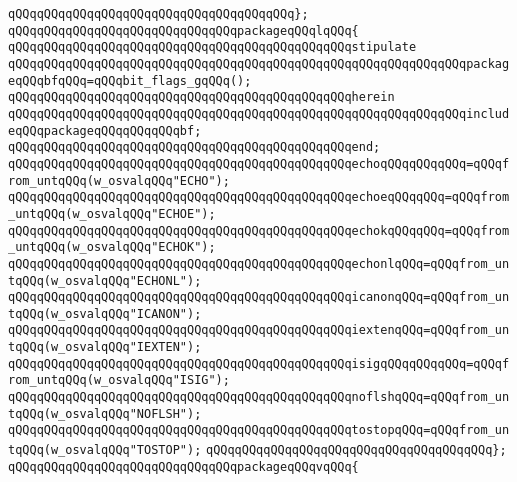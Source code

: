 \verb|qQQqqQQqqQQqqQQqqQQqqQQqqQQqqQQqqQQqqQQq};|\newline
\newline
\verb|qQQqqQQqqQQqqQQqqQQqqQQqqQQqqQQqpackageqQQqlqQQq{|\newline
\newline
\verb|qQQqqQQqqQQqqQQqqQQqqQQqqQQqqQQqqQQqqQQqqQQqqQQqstipulate|\newline
\verb|qQQqqQQqqQQqqQQqqQQqqQQqqQQqqQQqqQQqqQQqqQQqqQQqqQQqqQQqqQQqqQQqpackageqQQqbfqQQq=qQQqbit_flags_gqQQq();|\newline
\verb|qQQqqQQqqQQqqQQqqQQqqQQqqQQqqQQqqQQqqQQqqQQqqQQqherein|\newline
\verb|qQQqqQQqqQQqqQQqqQQqqQQqqQQqqQQqqQQqqQQqqQQqqQQqqQQqqQQqqQQqqQQqincludeqQQqpackageqQQqqQQqqQQqbf;|\newline
\verb|qQQqqQQqqQQqqQQqqQQqqQQqqQQqqQQqqQQqqQQqqQQqqQQqend;|\newline
\newline
\verb|qQQqqQQqqQQqqQQqqQQqqQQqqQQqqQQqqQQqqQQqqQQqqQQqechoqQQqqQQqqQQq=qQQqfrom_untqQQq(w_osvalqQQq"ECHO");|\newline
\verb|qQQqqQQqqQQqqQQqqQQqqQQqqQQqqQQqqQQqqQQqqQQqqQQqechoeqQQqqQQq=qQQqfrom_untqQQq(w_osvalqQQq"ECHOE");|\newline
\verb|qQQqqQQqqQQqqQQqqQQqqQQqqQQqqQQqqQQqqQQqqQQqqQQqechokqQQqqQQq=qQQqfrom_untqQQq(w_osvalqQQq"ECHOK");|\newline
\verb|qQQqqQQqqQQqqQQqqQQqqQQqqQQqqQQqqQQqqQQqqQQqqQQqechonlqQQq=qQQqfrom_untqQQq(w_osvalqQQq"ECHONL");|\newline
\verb|qQQqqQQqqQQqqQQqqQQqqQQqqQQqqQQqqQQqqQQqqQQqqQQqicanonqQQq=qQQqfrom_untqQQq(w_osvalqQQq"ICANON");|\newline
\verb|qQQqqQQqqQQqqQQqqQQqqQQqqQQqqQQqqQQqqQQqqQQqqQQqiextenqQQq=qQQqfrom_untqQQq(w_osvalqQQq"IEXTEN");|\newline
\verb|qQQqqQQqqQQqqQQqqQQqqQQqqQQqqQQqqQQqqQQqqQQqqQQqisigqQQqqQQqqQQq=qQQqfrom_untqQQq(w_osvalqQQq"ISIG");|\newline
\verb|qQQqqQQqqQQqqQQqqQQqqQQqqQQqqQQqqQQqqQQqqQQqqQQqnoflshqQQq=qQQqfrom_untqQQq(w_osvalqQQq"NOFLSH");|\newline
\verb|qQQqqQQqqQQqqQQqqQQqqQQqqQQqqQQqqQQqqQQqqQQqqQQqtostopqQQq=qQQqfrom_untqQQq(w_osvalqQQq"TOSTOP");|\newline
\verb|qQQqqQQqqQQqqQQqqQQqqQQqqQQqqQQqqQQqqQQq};|\newline
\newline
\verb|qQQqqQQqqQQqqQQqqQQqqQQqqQQqqQQqpackageqQQqvqQQq{|\newline
